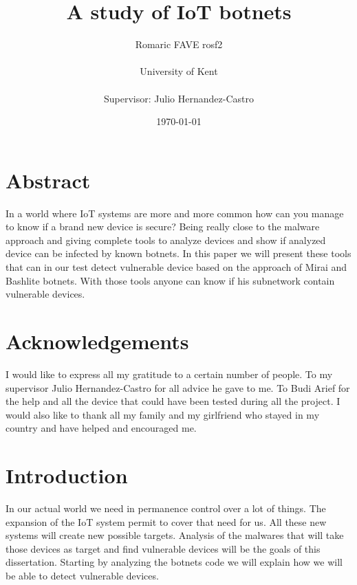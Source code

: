 \documentclass{report}
\date{\monthyeardate\today}
\begin{document}
\title{A study of IoT botnets}
\author{Romaric FAVE rosf2\\
  \\
  University of Kent\\
  \\
  Supervisor: Julio Hernandez-Castro
}

\maketitle

\tableofcontents

\chapter*{Abstract}
In a world where IoT systems are more and more common how can you manage to know if a brand new device is secure? Being really close to the malware approach and giving complete tools to analyze devices and show if analyzed device can be infected by known botnets. In this paper we will present these tools that can in our test detect vulnerable device based on the approach of Mirai and Bashlite botnets. With those tools anyone can know if his subnetwork contain vulnerable devices.

\chapter*{Acknowledgements}
I would like to express all my gratitude to a certain number of people.\newline
To my supervisor Julio Hernandez-Castro for all advice he gave to me.\newline
To Budi Arief for the help and all the device that could have been tested during all the project.\newline
I would also like to thank all my family and my girlfriend who stayed in my country and have helped and encouraged me.

\chapter{Introduction}
In our actual world we need in permanence control over a lot of things. The expansion of the IoT system permit to cover that need for us. All these new systems will create new possible targets. Analysis of the malwares that will take those devices as target and find vulnerable devices will be the goals of this dissertation.\newline
Starting by analyzing the botnets code we will explain how we will be able to detect vulnerable devices.
\end{document}
